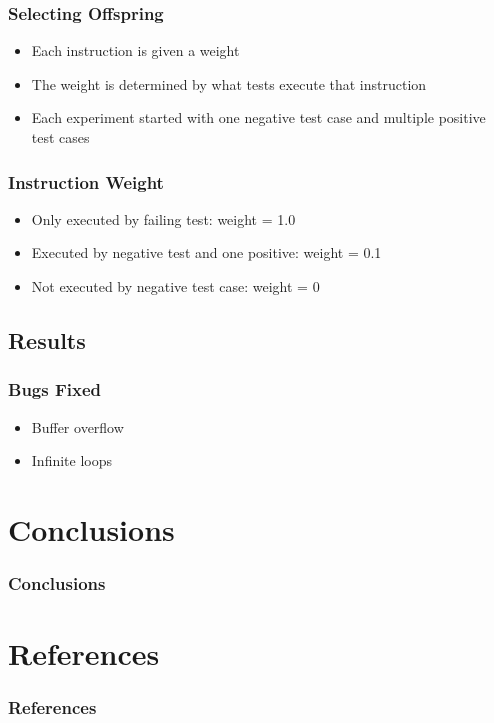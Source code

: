 \documentclass{beamer}
\begin{document}
\begin{frame}
  \frametitle{Selecting Offspring}
  \begin{itemize}
  \item Each instruction is given a weight
  \item The weight is determined by what tests execute that instruction
  \item Each experiment started with one negative test case and multiple positive test cases
  \end{itemize}
\end{frame}

\begin{frame}
  \frametitle{Instruction Weight}
  
    \begin{itemize}
  	\item Only executed by failing test: weight = 1.0
  	\item Executed by negative test and one positive: weight = 0.1
  	\item Not executed by negative test case: weight = 0
  \end{itemize}
\end{frame}

\subsection[Results]{Results}
\begin{frame}


\frametitle{Bugs Fixed}
\begin{itemize}

\item Buffer overflow
\item Infinite loops
\end{itemize}
\end{frame}


\section[Conclusions]{Conclusions}

\begin{frame}
\frametitle{Conclusions}
\end{frame}

\section*{References}

\begin{frame} 
	\frametitle{References} 
	
	\begin{thebibliography}{lskdjf}
  	\end{thebibliography}
\end{frame} 
\end{document}
